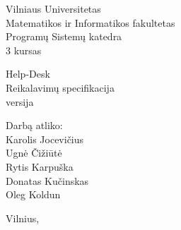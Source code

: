 \begin{titlepage}
    \begin{center}

        {\large
            Vilniaus Universitetas \\
            Matematikos ir Informatikos fakultetas \\
            Programų Sistemų katedra \\
            3 kursas
        }

        \vspace{\fill}

        {\huge
            Help-Desk
        } \\[0.5cm]
        {\large
            Reikalavimų specifikacija \\
            \versionString{} versija
        }

        \vspace{3cm}

        \begin{flushright}
            \begin{minipage}{0.4\textwidth}
                Darbą atliko: \\
                Karolis Jocevičius \\
                Ugnė Čižiūtė \\
                Rytis Karpuška \\
                Donatas Kučinskas \\
                Oleg Koldun
            \end{minipage}
        \end{flushright}

        \vspace{\fill}

        {\large Vilnius, \the\year}

    \end{center}
\end{titlepage}
